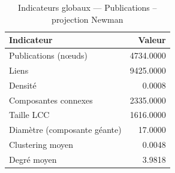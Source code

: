 \begin{table}
\caption{Indicateurs globaux — Publications – projection Newman}
\label{tab:global_result_pub_newman}
\begin{tabular}{lr}
\toprule
Indicateur & Valeur \\
\midrule
Publications (nœuds) & 4734.0000 \\
Liens & 9425.0000 \\
Densité & 0.0008 \\
Composantes connexes & 2335.0000 \\
Taille LCC & 1616.0000 \\
Diamètre (composante géante) & 17.0000 \\
Clustering moyen & 0.0048 \\
Degré moyen & 3.9818 \\
\bottomrule
\end{tabular}
\end{table}
